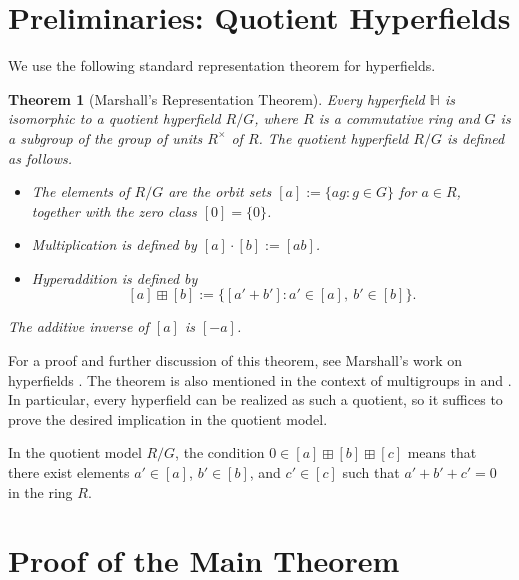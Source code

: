 \documentclass[11pt]{article}
\newtheorem{theorem}{Theorem}[section]
\begin{document}
\section{Preliminaries: Quotient Hyperfields}

We use the following standard representation theorem for hyperfields.

\begin{theorem}[Marshall's Representation Theorem]\label{thm:marshall}
Every hyperfield $\mathbb{H}$ is isomorphic to a quotient hyperfield $R/G$, where
$R$ is a commutative ring and $G$ is a subgroup of the group of units $R^\times$ of $R$.
The quotient hyperfield $R/G$ is defined as follows.
\begin{itemize}
\item The elements of $R/G$ are the orbit sets $[a] := \{a g : g \in G\}$ for $a \in R$,
      together with the zero class $[0]=\{0\}$.
\item Multiplication is defined by $[a]\cdot [b] := [ab]$.
\item Hyperaddition is defined by
      \[
      [a] \boxplus [b] := \{ [a' + b'] : a' \in [a],\ b' \in [b] \}.
      \]
\end{itemize}
The additive inverse of $[a]$ is $[-a]$.
\end{theorem}

For a proof and further discussion of this theorem, see Marshall's work on hyperfields
\cite{Marshall}. The theorem is also mentioned in the context of multigroups in
\cite{Viro} and \cite{ViroTropical}. In particular, every hyperfield can be realized as
such a quotient, so it suffices to prove the desired implication in the quotient model.

\begin{remark}
In the quotient model $R/G$, the condition $0 \in [a] \boxplus [b] \boxplus [c]$ means
that there exist elements $a' \in [a]$, $b' \in [b]$, and $c' \in [c]$ such that
$a' + b' + c' = 0$ in the ring $R$.
\end{remark}

\section{Proof of the Main Theorem}
\end{document}
